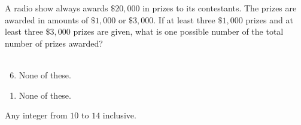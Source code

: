  
A radio show always awards $\$20,000$ in prizes to its contestants.  The prizes are awarded in amounts of $\$1,000$ or $\$3,000$.  If at least three $\$1,000$ prizes and at least three $\$3,000$ prizes are given, what is one possible number of the total number of prizes awarded?\\ \\


\ifsat
	\begin{enumerate}[label=\Alph*)]
	\end{enumerate}
\else
\fi

\ifacteven
	\begin{enumerate}[label=\textbf{\Alph*.},itemsep=\fill,align=left]
		\setcounter{enumii}{5}
		\item None of these. 
	\end{enumerate}
\else
\fi

\ifactodd
	\begin{enumerate}[label=\textbf{\Alph*.},itemsep=\fill,align=left]
		\item None of these. 
	\end{enumerate}
\else
\fi

\ifgridin
Any integer from $10$ to $14$ inclusive.
\else
\fi

